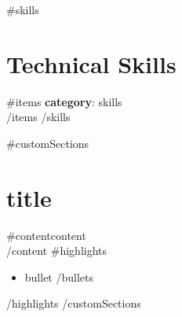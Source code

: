\documentclass[11pt,a4paper]{article}
\begin{document}
{{#skills}}
\section{Technical Skills}
{{#items}}
\textbf{{{category}}}: {{skills}} \\
{{/items}}
{{/skills}}

{{#customSections}}
\section{{{title}}}
{{#content}}{{content}} \\{{/content}}
{{#highlights}}
\begin{itemize}[noitemsep,topsep=1pt]
{{#bullets}}
    \item {{bullet}}
{{/bullets}}
\end{itemize}
{{/highlights}}
{{/customSections}}
\end{document}
